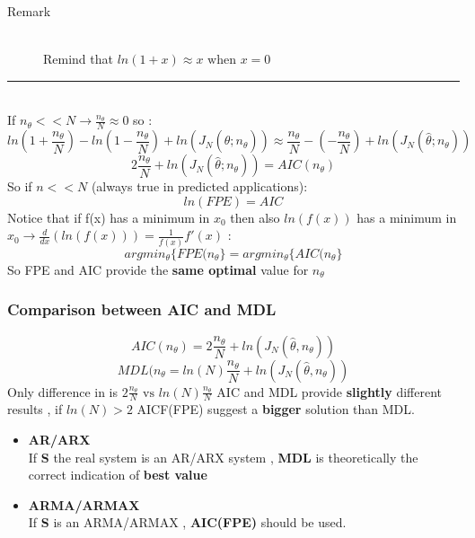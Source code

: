 \begin{description}
\item[Remark]\hfill\\
Remind that $ln(1+x) \approx x \text{ when } x=0$
\end{description}
\par\noindent\rule{\textwidth}{0.4pt}
\\If $n_{\theta}<<N \to \frac{n_{\theta}}{N} \approx 0$ so :
$$ ln(1+\frac{n_{\theta}}{N}) - ln(1-\frac{n_{\theta}}{N}) + ln(J_N(\hat{\theta};n_{\theta})) \approx \frac{n_{\theta}}{N}-(-\frac{n_{\theta}}{N})+ln(J_N(\hat{\theta};n_{\theta}))$$
$$ 2\frac{n_{\theta}}{N}+ln(J_N(\hat{\theta};n_{\theta})) = AIC(n_{\theta})$$
So if $n<<N$ (always true in predicted applications):
\[
\boxed{ln(FPE) = AIC	}
\]
Notice that if f(x) has a minimum in $x_0$ then also $ln(f(x))$ has a minimum in $x_0 \to \frac{d}{dx}(ln(f(x))) = \frac{1}{f(x)}f'(x)$ :
\[
\boxed{argmin_{\theta}\{FPE(n_{\theta}\}=argmin_{\theta}\{AIC(n_{\theta}\}}
\] 
So FPE and AIC provide the \textbf{same optimal} value for $n_{\theta}$

\subsubsection{Comparison between AIC and MDL}
$$ AIC(n_\theta) = 2 \frac{n_{\theta}}{N}+ ln(J_N(\hat{\theta},n_{\theta})) $$
$$ MDL(n_{\theta}=ln(N)\frac{n_{\theta}}{N}+ln(J_N(\hat{\theta},n_{\theta}))$$
Only difference in is $2 \frac{n_{\theta}}{N} \text{ vs } ln(N)\frac{n_{\theta}}{N} $
AIC and MDL provide \textbf{slightly } different results , if $ln(N) > 2$ AICF(FPE) suggest a \textbf{bigger} solution than MDL.\\
\begin{itemize}
\item \textbf{AR/ARX}\\
If \textbf{S} the real system is an AR/ARX system , \textbf{MDL} is theoretically the correct indication of \textbf{best value}
\item \textbf{ARMA/ARMAX}\\
If \textbf{S} is an ARMA/ARMAX , \textbf{AIC(FPE)} should be used.
\end{itemize}
\newpage
